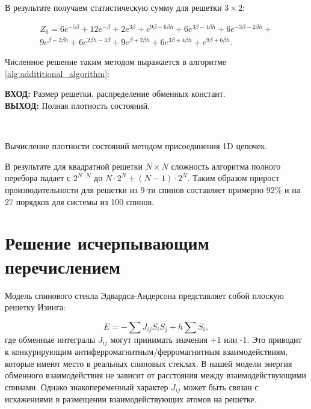 \documentclass[utf8, babel, sor, jor, amsmath, amssymb, reprint]{elsarticle} %
\begin{document}
В результате получаем статистическую сумму для решетки $3 \times 2$:

\begin{equation}
	\label{eq:stat_3_res}
	\begin{alignedat}{2}
		Z_6 = 6 e^{-5 \beta }+12 e^{-\beta }+2 e^{3 \beta }+e^{9 \beta -6 \beta  h}+6 e^{3 \beta -4 \beta  h}+6 e^{-3 \beta -2 \beta  h}+\\
		9 e^{\beta -2 \beta  h}+6 e^{2 \beta  h-3 \beta }+9 e^{\beta +2 \beta  h}+6 e^{3 \beta +4 \beta  h}+e^{9 \beta +6 \beta  h}.
	\end{alignedat}
\end{equation}

Численное решение таким методом выражается в алгоритме \ref{alg:addititional_algorithm}:


\begin{algorithm}[H]
	\textbf{ВХОД:} Размер решетки, распределение обменных констант.\\
	\textbf{ВЫХОД:} Полная плотность состояний.
	\begin{algorithmic}
		{
			{
			}
			\ENDFOR\\
		}
		\ENDFOR
	\end{algorithmic}
	\caption{Вычисление плотности состояний методом присоединения 1D цепочек.}
	\label{alg:addititional_algorithm}
\end{algorithm}
				
В результате для квадратной решетки $N \times N$ сложность алгоритма полного перебора падает с $2^{N \cdot N}$ до $N \cdot 2^N + (N - 1) \cdot 2^N$. Таким образом прирост производительности для решетки из 9-ти спинов составляет примерно 92\% и на 27 порядков для системы из 100 спинов.


\section{Решение исчерпывающим перечислением}

Модель спинового стекла Эдвардса-Андерсона представляет собой плоскую решетку Изинга:

\begin{equation}
	E = -\sum J_{ij} S_i S_j + h \sum S_i,
	\label{eq:ising_energy}
\end{equation}
где обменные интегралы $J_{ij}$ могут принимать значения +1 или -1. Это приводит к конкурирующим антиферромагнитным/ферромагнитным взаимодействиям, которые имеют место в реальных спиновых стеклах. В нашей модели энергия обменного взаимодействия не зависит от расстояния между взаимодействующими спинами. Однако знакопеременный характер $J_{ij}$ может быть связан с искажениями в размещении взаимодействующих атомов на решетке.
\end{document}
